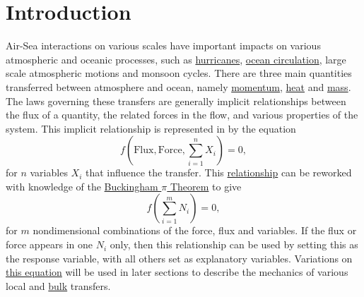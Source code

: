 \documentclass{report}
\begin{document}
 \section{Introduction} 
\label{intro}
Air-Sea interactions on various scales have important impacts on various atmospheric and oceanic processes, such as \hyperref[hurricanes]{hurricanes}, \hyperref[circulation]{ocean circulation}, large scale atmospheric motions and monsoon cycles.
There are three main quantities transferred between atmosphere and ocean, namely  \hyperref[momentumtransfer]{momentum}, \hyperref[heattransfer]{heat} and \hyperref[masstransfer]{mass}.
The laws governing these transfers are generally implicit relationships between the flux of a quantity, the related forces in the flow, and various properties of the system.
This implicit relationship is represented in \citet{csanady04} by the equation
\begin{equation}
f\left(\mbox{Flux},\mbox{Force},\sum^n_{i=1} X_i \right) =0,
\label{eq:fluxforce}
\end{equation}
for $n$ variables $X_i$ that influence the transfer.
This \hyperref[eq:fluxforce]{relationship} can be reworked with knowledge of the \hyperref[buckingham]{Buckingham $\pi$ Theorem} to give
\begin{equation}
f\left(\sum^m_{i=1} N_i \right) =0,
\label{eq:fluxforce2}
\end{equation}
for $m$ nondimensional combinations of the force, flux and variables.
If the flux or force appears in one $N_i$ only, then this relationship can be used by setting this as the response variable, with all others set as explanatory variables.
Variations on \hyperref[eq:fluxforce2]{this equation} will be used in later sections to describe the mechanics of various local and \hyperref[bulk]{bulk} transfers.
\end{document}
